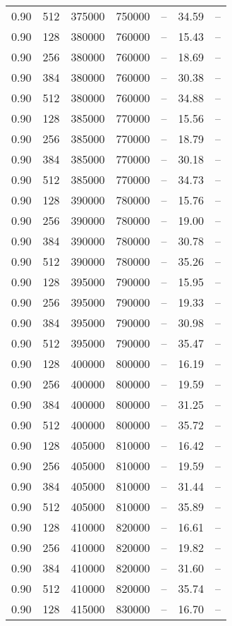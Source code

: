 \begin{tabular}{l|l|l|l|l|l|l}
0.90 & 512 & 375000 & 750000 & -- & 34.59 & --\\
0.90 & 128 & 380000 & 760000 & -- & 15.43 & --\\
0.90 & 256 & 380000 & 760000 & -- & 18.69 & --\\
0.90 & 384 & 380000 & 760000 & -- & 30.38 & --\\
0.90 & 512 & 380000 & 760000 & -- & 34.88 & --\\
0.90 & 128 & 385000 & 770000 & -- & 15.56 & --\\
0.90 & 256 & 385000 & 770000 & -- & 18.79 & --\\
0.90 & 384 & 385000 & 770000 & -- & 30.18 & --\\
0.90 & 512 & 385000 & 770000 & -- & 34.73 & --\\
0.90 & 128 & 390000 & 780000 & -- & 15.76 & --\\
0.90 & 256 & 390000 & 780000 & -- & 19.00 & --\\
0.90 & 384 & 390000 & 780000 & -- & 30.78 & --\\
0.90 & 512 & 390000 & 780000 & -- & 35.26 & --\\
0.90 & 128 & 395000 & 790000 & -- & 15.95 & --\\
0.90 & 256 & 395000 & 790000 & -- & 19.33 & --\\
0.90 & 384 & 395000 & 790000 & -- & 30.98 & --\\
0.90 & 512 & 395000 & 790000 & -- & 35.47 & --\\
0.90 & 128 & 400000 & 800000 & -- & 16.19 & --\\
0.90 & 256 & 400000 & 800000 & -- & 19.59 & --\\
0.90 & 384 & 400000 & 800000 & -- & 31.25 & --\\
0.90 & 512 & 400000 & 800000 & -- & 35.72 & --\\
0.90 & 128 & 405000 & 810000 & -- & 16.42 & --\\
0.90 & 256 & 405000 & 810000 & -- & 19.59 & --\\
0.90 & 384 & 405000 & 810000 & -- & 31.44 & --\\
0.90 & 512 & 405000 & 810000 & -- & 35.89 & --\\
0.90 & 128 & 410000 & 820000 & -- & 16.61 & --\\
0.90 & 256 & 410000 & 820000 & -- & 19.82 & --\\
0.90 & 384 & 410000 & 820000 & -- & 31.60 & --\\
0.90 & 512 & 410000 & 820000 & -- & 35.74 & --\\
0.90 & 128 & 415000 & 830000 & -- & 16.70 & --\\

\end{tabular}
